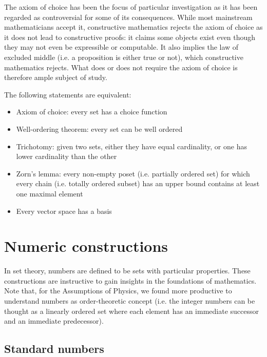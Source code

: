\documentclass{article}
\begin{document}
The axiom of choice has been the focus of particular investigation as it has been regarded as controversial for some of its consequences. While most mainstream mathematicians accept it, constructive mathematics rejects the axiom of choice as it does not lead to constructive proofs: it claims some objects exist even though they may not even be expressible or computable. It also implies the law of excluded middle (i.e. a proposition is either true or not), which constructive mathematics rejects. What does or does not require the axiom of choice is therefore ample subject of study.

\begin{prop}
	The following statements are equivalent:
	\begin{itemize}
		\item Axiom of choice: every set has a choice function
		\item Well-ordering theorem: every set can be well ordered
		\item Trichotomy: given two sets, either they have equal cardinality, or one has lower cardinality than the other
		\item Zorn's lemma: every non-empty poset (i.e. partially ordered set) for which every chain (i.e. totally ordered subset) has an upper bound contains at least one maximal element
		\item Every vector space has a basis
	\end{itemize}
\end{prop}

\section{Numeric constructions}
In set theory, numbers are defined to be sets with particular properties. These constructions are instructive to gain insights in the foundations of mathematics. Note that, for the Assumptions of Physics, we found more productive to understand numbers as order-theoretic concept (i.e. the integer numbers can be thought as a linearly ordered set where each element has an immediate successor and an immediate predecessor).

\subsection{Standard numbers}
\end{document}
